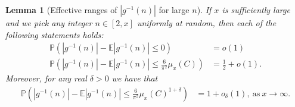 \documentclass[11pt,reqno,a4letter]{article}
\numberwithin{figure}{section}
\numberwithin{table}{section}
\theoremstyle{plain}
\newtheorem{lemma}[theorem]{Lemma}
\numberwithin{theorem}{section}
\theoremstyle{definition}
\begin{document}
\begin{lemma}[Effective ranges of $|g^{-1}(n)|$ for large $n$] 
\label{lemma_ProbsOfAbsgInvnDist_v2} 
If $x$ is sufficiently large and we pick any integer $n \in [2, x]$ uniformly at random, then 
each of the following statements holds: 
\begin{align*} 
\tag{A}
\mathbb{P}\left(|g^{-1}(n)| - \mathbb{E}|g^{-1}(n)| \leq 0\right) & = o(1) \\ 
\tag{B} 
\mathbb{P}\left(|g^{-1}(n)| - \mathbb{E}|g^{-1}(n)| \leq \frac{6}{\pi^2} \mu_x(C)\right) & = 
     \frac{1}{2} + o(1). 
\end{align*} 
Moreover, for any real $\delta > 0$ we have that 
\begin{align*} 
\tag{C} 
\mathbb{P}\left(|g^{-1}(n)| - \mathbb{E}|g^{-1}(n)| \leq \frac{6}{\pi^2} \mu_x(C)^{1 + \delta}\right) & = 
     1 + o_{\delta}(1), 
     \mathrm{\ as\ } x \rightarrow \infty. 
\end{align*} 
\end{lemma} 
\end{document}
